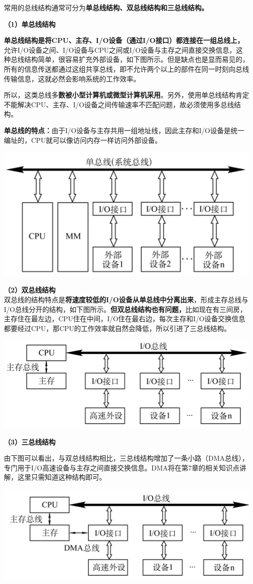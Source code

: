 常用的总线结构通常可分为\textbf{单总线结构、双总线结构和三总线结构。}

{\textbf{（1）单总线结构}}

\textbf{单总线结构是将CPU、主存、I/O设备（通过I/O接口）都连接在一组总线上，}允许I/O设备之间、I/O设备与CPU之间或I/O设备与主存之间直接交换信息，这种总线结构简单，很容易扩充外部设备，如下图所示。但是缺点也是显而易见的，所有的信息传送都通过这组共享总线，即不允许两个以上的部件在同一时刻向总线传输信息，这就必然会影响系统的工作效率。

所以，这类总线多\textbf{数被小型计算机或微型计算机采用}。另外，使用单总线结构肯定不能解决CPU、主存、I/O设备之间传输速率不匹配问题，故必须使用多总线结构。

\textbf{单总线的特点：}由于I/O设备与主存共用一组地址线，因此主存和I/O设备是统一编址的，CPU就可以像访问内存一样访问外部设备。

\includegraphics[width=6in]{png-jpeg-pics/9B4EDBB4E0AAF454E53B9A78F1B8AA1D.png}

{\textbf{（2）双总线结构}}\\

双总线的结构特点是\textbf{将速度较低的I/O设备从单总线中分离出来}，形成主存总线与I/O总线分开的结构，如下图所示。\textbf{但双总线结构也有问题，}比如现在有三间房，主存住在最左边，CPU住在中间，I/O住在最右边，每次主存和I/O设备交换信息都要经过CPU，那CPU的工作效率就自然会降低，所以引进了三总线结构。

\includegraphics[width=6in]{png-jpeg-pics/33D71CE5A3125B7F5A4CD6D2D80FBD95.png}

{\textbf{（3）三总线结构}}

由下图可以看出，与双总线结构相比，三总线结构增加了一条小路（DMA总线），专门用于I/O高速设备与主存之间直接交换信息。DMA将在第7章的相关知识点讲解，这里只需知道这种结构即可。

\includegraphics[width=6in]{png-jpeg-pics/FD242FF09C949861F0804447921171E8.png}
